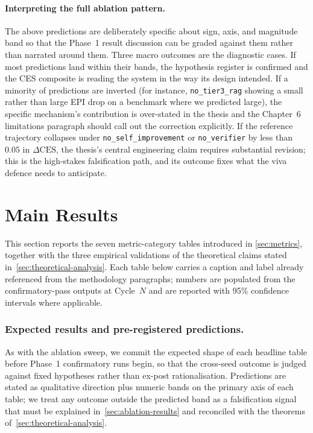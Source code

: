 \paragraph{Interpreting the full ablation pattern.}
The above predictions are deliberately specific about sign, axis, and
magnitude band so that the Phase~1 result discussion can be graded
against them rather than narrated around them. Three macro outcomes
are the diagnostic cases. If most predictions land within their
bands, the hypothesis register is confirmed and the CES composite is
reading the system in the way its design intended. If a minority of
predictions are inverted (for instance, \texttt{no\_tier3\_rag}
showing a small rather than large EPI drop on a benchmark where we
predicted large), the specific mechanism's contribution is
over-stated in the thesis and the Chapter~6 limitations paragraph
should call out the correction explicitly. If the reference
trajectory collapses under \texttt{no\_self\_improvement} or
\texttt{no\_verifier} by less than $0.05$ in $\Delta\text{CES}$,
the thesis's central engineering claim requires substantial
revision; this is the high-stakes falsification path, and its
outcome fixes what the viva defence needs to anticipate.

\section{Main Results}
\label{sec:main-results}

This section reports the seven metric-category tables introduced in
\cref{sec:metrics}, together with the three empirical validations of
the theoretical claims stated in~\cref{sec:theoretical-analysis}.
Each table below carries a caption and label already referenced from
the methodology paragraphs; numbers are populated from the
confirmatory-pass outputs at Cycle~$N$ and are reported with 95\%
confidence intervals where applicable.

\subsubsection*{Expected results and pre-registered predictions.}
As with the ablation sweep, we commit the expected shape of each
headline table before Phase~1 confirmatory runs begin, so that the
cross-seed outcome is judged against fixed hypotheses rather than
ex-post rationalisation. Predictions are stated as qualitative
direction plus numeric bands on the primary axis of each table; we
treat any outcome outside the predicted band as a falsification
signal that must be explained in~\cref{sec:ablation-results} and
reconciled with the theorems of~\cref{sec:theoretical-analysis}.

